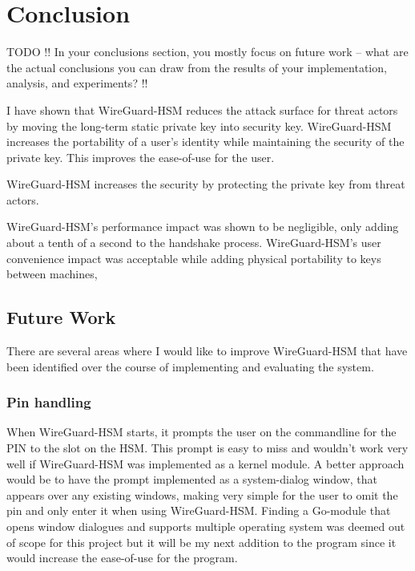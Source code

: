 \documentclass [11pt, proquest] {uwthesis}[2020/02/24]
\begin{document}
\chapter {Conclusion}
 
TODO !! In your conclusions section, you mostly focus on future work -- what are the actual conclusions you can draw from the results of your implementation, analysis, and experiments? !!

I have shown that WireGuard-HSM reduces the attack surface for threat actors by moving the long-term static private key into security key. WireGuard-HSM increases the portability of a user's identity while maintaining the security of the private key. This improves the ease-of-use for the user.

WireGuard-HSM increases the security by protecting the private key from threat actors.

WireGuard-HSM's performance impact was shown to be negligible, only adding about a tenth of a second to the handshake process.
WireGuard-HSM's user convenience impact was acceptable while adding physical portability to keys between machines,

\section {Future Work}
There are several areas where I would like to improve WireGuard-HSM that have been identified over the course of implementing and evaluating the system. 

\subsection{Pin handling}
When WireGuard-HSM starts, it prompts the user on the commandline for the PIN to the slot on the HSM. 
This prompt is easy to miss and wouldn't work very well if WireGuard-HSM was implemented as a kernel module. A better approach would be to have the prompt implemented as a system-dialog window, that appears over any existing windows, making very simple for the user to omit the pin and only enter it when using WireGuard-HSM. Finding a Go-module that opens window dialogues and supports multiple operating system was deemed out of scope for this project but it will be my next addition to the program since it would increase the ease-of-use for the program. 
 
\end{document}

